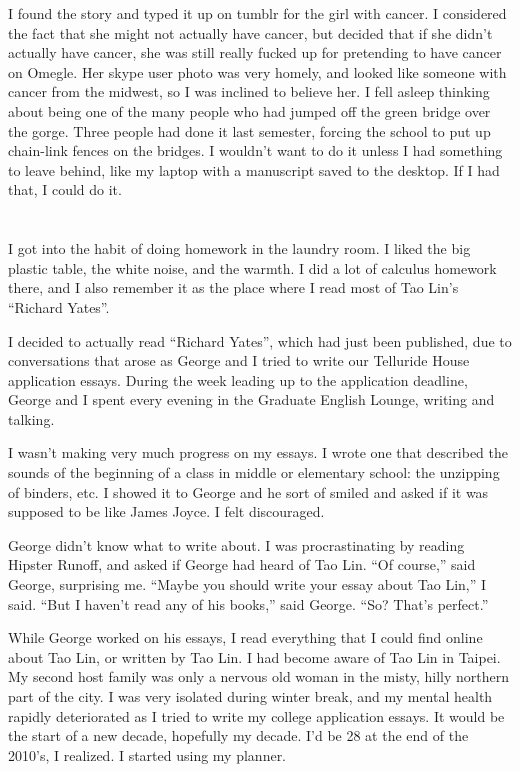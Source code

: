 I found the story and typed it up on tumblr for the girl with cancer.  I
considered the fact that she might not actually have cancer, but decided that if
she didn't actually have cancer, she was still really fucked up for pretending
to have cancer on Omegle.  Her skype user photo was very homely, and looked like
someone with cancer from the midwest, so I was inclined to believe her.  I fell
asleep thinking about being one of the many people who had jumped off the green
bridge over the gorge.  Three people had done it last semester, forcing the
school to put up chain-link fences on the bridges.  I wouldn't want to do it
unless I had something to leave behind, like my laptop with a manuscript saved
to the desktop.  If I had that, I could do it.

\section{}

I got into the habit of doing homework in the laundry room.  I liked the big
plastic table, the white noise, and the warmth.  I did a lot of calculus
homework there, and I also remember it as the place where I read most of Tao
Lin's ``Richard Yates''.  

I decided to actually read ``Richard Yates'', which had just been published, due
to conversations that arose as George and I tried to write our Telluride House
application essays.  During the week leading up to the application deadline,
George and I spent every evening in the Graduate English Lounge, writing and
talking. 

I wasn't making very much progress on my essays.  I wrote one that described the
sounds of the beginning of a class in middle or elementary school: the unzipping
of binders, etc.  I showed it to George and he sort of smiled and asked if it
was supposed to be like James Joyce.  I felt discouraged. 

George didn't know what to write about.  I was procrastinating by reading
Hipster Runoff, and asked if George had heard of Tao Lin.  ``Of course,'' said
George, surprising me.  ``Maybe you should write your essay about Tao Lin,'' I
said.  ``But I haven't read any of his books,'' said George.  ``So?  That's
perfect.''

While George worked on his essays, I read everything that I could find online
about Tao Lin, or written by Tao Lin.  I had become aware of Tao Lin in Taipei.
My second host family was only a nervous old woman in the misty, hilly northern
part of the city.  I was very isolated during winter break, and my mental health
rapidly deteriorated as I tried to write my college application essays.  It
would be the start of a new decade, hopefully my decade.  I'd be 28 at the end
of the 2010's, I realized.  I started using my planner.

